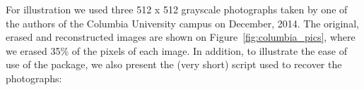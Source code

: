 \documentclass[12pt]{article}
\begin{document}
For illustration we used three  512 x 512 grayscale photographs taken by one of the authors of the Columbia University campus on December, 2014. The original, erased and reconstructed images are shown on Figure~\ref{fig:columbia_pics}, where we erased 35\% of the pixels of each image.  In addition, to illustrate the ease of use of the package, we also present the (very short) script used to recover the photographs:



\begin{figure}[H]
\end{figure}
\end{document}

